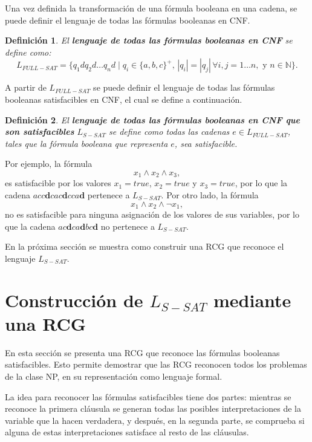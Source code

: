 \documentclass{article}
\newtheorem{definition}{Definición}
\begin{document}
Una vez definida la transformación de una fórmula booleana en una cadena, se puede definir el lenguaje de todas las fórmulas booleanas en CNF.

\begin{definition}
    El \textbf{lenguaje de todas las fórmulas booleanas en CNF} se define como:
    \[
        L_{FULL-SAT} = \{ q_1dq_2d\dots q_nd \mid q_i \in \{a, b,c\}^+\text{, }
        |q_i| = |q_j| \, \forall i, j =1\dots n, \text{ y } n\in \mathbb{N}\}.
    \]
\end{definition}

A partir de $L_{FULL-SAT}$ se puede definir el lenguaje de todas las fórmulas booleanas satisfacibles
en CNF, el cual se define a continuación.

\begin{definition}
    El \textbf{lenguaje de todas las fórmulas booleanas en CNF que son satisfacibles} $L_{S-SAT}$ se define como todas las cadenas $e\in L_{FULL-SAT}$,
    tales que la fórmula booleana que representa $e$, sea satisfacible.
\end{definition}

Por ejemplo, la fórmula $$x_1\wedge x_2 \wedge x_3,$$ es satisfacible por los valores $x_1=true$, $x_2=true$ y $x_3=true$, por lo que la
cadena $acc\mathbf{d}cac\mathbf{d}cca\mathbf{d}$ pertenece a $L_{S-SAT}$. Por otro lado, la fórmula $$x_1\wedge x_2 \wedge \neg x_1,$$
no es satisfacible para ninguna asignación de los valores de sus variables, por lo que la cadena $ac\mathbf{d}ca\mathbf{d}bc\mathbf{d}$
no pertenece a $L_{S-SAT}$.

En la próxima sección se muestra como construir una RCG que reconoce el lenguaje $L_{S-SAT}$.


\section{Construcción de $L_{S-SAT}$ mediante una RCG}
\label{sec:LSATRCG}

En esta sección se presenta una RCG que reconoce las fórmulas booleanas satisfacibles. Esto permite demostrar
que las RCG reconocen todos los problemas de la clase NP, en su representación como lenguaje formal.

La idea para reconocer las fórmulas satisfacibles tiene dos partes: mientras se reconoce la primera cláusula se generan todas las posibles interpretaciones de la variable que la hacen verdadera, y después, en la segunda parte, se comprueba si alguna de estas interpretaciones satisface al resto de las cláusulas.
\end{document}

